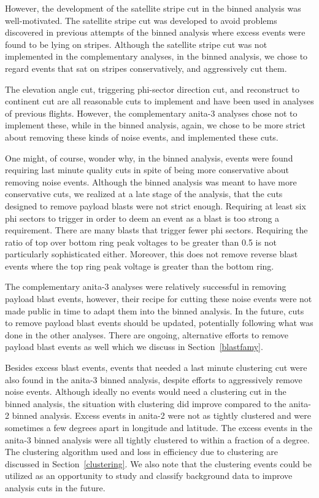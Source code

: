 However, the development of the satellite stripe cut in the binned analysis was well-motivated.
The satellite stripe cut was developed to avoid problems discovered in previous attempts of the binned analysis where excess events were found to be lying on stripes.  
Although the satellite stripe cut was not implemented in the complementary analyses, in the binned analysis, we chose to regard events that sat on stripes conservatively, and aggressively cut them. 

The elevation angle cut, triggering phi-sector direction cut, and reconstruct to continent cut are all reasonable cuts to implement and have been used in analyses of previous flights. However, the complementary \gls{anita}-3 analyses chose not to implement these, while in the binned analysis, again, we chose to be more strict about removing these kinds of noise events, and implemented these cuts. 

One might, of course, wonder why, in the binned analysis, events were found requiring last minute quality cuts in spite of being more conservative about removing noise events.
Although the binned analysis was meant to have more conservative cuts, we realized at a late stage of the analysis, that the cuts designed to remove payload blasts were not strict enough. Requiring at least six phi sectors to trigger in order to deem an event as a blast is too strong a requirement. There are many blasts that trigger fewer phi sectors. Requiring the ratio of top over bottom ring peak voltages to be greater than 0.5 is not particularly sophisticated either. Moreover, this does not remove reverse blast events where the top ring peak voltage is greater than the bottom ring. 

The complementary \gls{anita}-3 analyses were relatively successful in removing payload blast events, however, their recipe for cutting these noise events were not made public in time to adapt them into the binned analysis. In the future, cuts to remove payload blast events should be updated, potentially following what was done in the other analyses. 
There are ongoing, alternative efforts to remove payload blast events as well which we discuss in Section~\ref{blastfamy}.

Besides excess blast events, events that needed a last minute clustering cut were also found in the \gls{anita}-3 binned analysis, despite efforts to aggressively remove noise events. Although ideally no events would need a clustering cut in the binned analysis, the situation with clustering did improve compared to the \gls{anita}-2 binned analysis. Excess events in \gls{anita}-2 were not as tightly clustered and were sometimes a few degrees apart in longitude and latitude. The excess events in the \gls{anita}-3 binned analysis were all tightly clustered to within a fraction of a degree. The clustering algorithm used and loss in efficiency due to clustering are discussed in Section~\ref{clustering}. We also note that the clustering events could be utilized as an opportunity to study and classify background data to improve analysis cuts in the future. 


